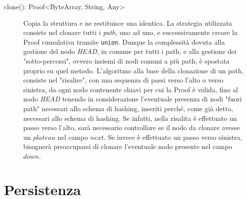 \begin{description}
				\begin{algorithm}[H]
				\end{algorithm}
			
			\item[clone(): Proof<ByteArray, String, Any>]  Copia la struttura e ne restituisce una identica. La strategia utilizzata consiste nel clonare tutti i \textit{path}, uno ad uno, e successivamente creare la Proof cumulativa tramite \verb!union!. Dunque la complessità dovuta alla gestione del nodo \textit{HEAD}, in comune per tutti i path, e alla gestione dei "sotto-percorsi", ovvero insiemi di nodi comuni a più path, è spostata proprio su quel metodo. L'algoritmo alla base della clonazione di un path, consiste nel "risalire", con una sequenza di passi verso l'alto o verso sinistra, da ogni nodo contenente chiavi per cui la Proof è valida, fino al nodo \textit{HEAD} tenendo in considerazione l'eventuale presenza di nodi "fuori path" necessari allo schema di hashing, inseriti perché, come già detto, necessari allo schema di hashing. Se infatti, nella risalita è effettuato un passo verso l'alto, sarà necessario controllare se il nodo da clonare avesse un $ plateau $ nel campo $ next $. Se invece è effettuato un passo verso sinistra, bisognerà preoccuparsi di clonare l'eventuale nodo presente nel campo $ down $.
			
			\end{description}
	
\section{Persistenza}


